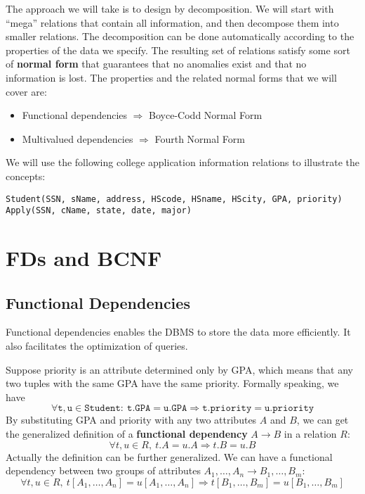 The approach we will take is to design by decomposition. We will start with ``mega'' relations that contain all information, and then decompose them into smaller relations. The decomposition can be done automatically according to the properties of the data we specify. The resulting set of relations satisfy some sort of \textbf{normal form} that guarantees that no anomalies exist and that no information is lost. The properties and the related normal forms that we will cover are:
\begin{itemize}
\item Functional dependencies $\Rightarrow$ Boyce-Codd Normal Form
\item Multivalued dependencies $\Rightarrow$ Fourth Normal Form
\end{itemize}
 We will use the following college application information relations to illustrate the concepts:
\begin{lstlisting}
Student(SSN, sName, address, HScode, HSname, HScity, GPA, priority)
Apply(SSN, cName, state, date, major)
\end{lstlisting}
\section{FDs and BCNF}
\subsection{Functional Dependencies}
Functional dependencies enables the DBMS to store the data more efficiently. It also facilitates the optimization of queries.

Suppose priority is an attribute determined only by GPA, which means that any two tuples with the same GPA have the same priority. Formally speaking, we have
\begin{equation*}
\mathtt{\forall t,u \in Student:\:t.GPA = u.GPA\Rightarrow t.priority=u.priority}
\end{equation*}
By substituting GPA and priority with any two attributes $A$ and $B$, we can get the generalized definition of a \textbf{functional dependency}  $A\rightarrow B$ in a relation $R$: 
\begin{equation*}
\forall t,u \in R,\:t.A = u.A\Rightarrow t.B=u.B
\end{equation*}
Actually the definition can be further generalized. We can have a functional dependency between two groups of attributes ${A_1,\dots,A_n\rightarrow B_1,\dots,B_m}$:
\begin{equation*}
\forall t,u \in R,\:t[A_1,\dots,A_n] = u[A_1,\dots,A_n]\Rightarrow t[B_1,\dots,B_m]=u[B_1,\dots,B_m]
\end{equation*}

